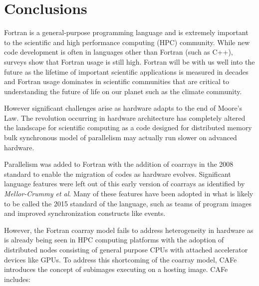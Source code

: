 \section{Conclusions}

Fortran is a general-purpose programming language and is extremely important to the
scientific and high performance computing (HPC) community.  While new code development is
often in languages other than Fortran (such as C++), surveys show that Fortran usage is
still high\cite{prabhu2011survey}.  Fortran will be with us well into the future as the
lifetime of important scientific applications is measured in decades and Fortran usage
dominates in scientific communities that are critical to understanding the future of
life on our planet such as the climate community.

However significant challenges arise as hardware adapts to the end of Moore's
Law\cite{exascale:workshop:2011}.  The revolution occurring in hardware architecture
has completely altered the landscape for scientific computing as a code designed for
distributed memory bulk synchronous model of parallelism may actually run slower on
advanced hardware\cite{Dubey:2014:SSC:2686745.2686756}.

Parallelism was added to Fortran with the addition of coarrays in the 2008
standard\cite{fortran:2008} to enable the migration of codes as hardware evolves.
Significant language features were left out of this early version of coarrays as
identified by \emph{Mellor-Crummy et al}\cite{mellor-crummey:2009:caf2}.  Many of these features
have been adopted in what is likely to be called the 2015 standard of the language\cite{fortran:2015},
such as teams of program images and improved synchronization constructs like events.


However, the Fortran coarray model fails to address heterogeneity in hardware as is already
being seen in HPC computing platforms with the adoption of distributed nodes consisting of
general purpose CPUs with attached accelerator devices like GPUs.  To address this shortcoming
of the coarray model, CAFe introduces the concept of subimages executing on a hosting image.  
CAFe includes:

